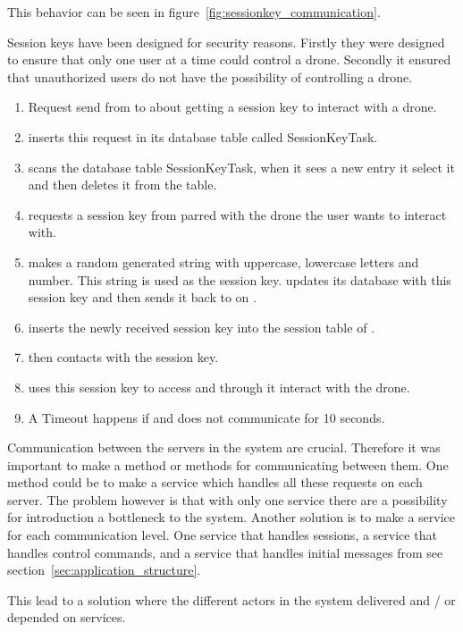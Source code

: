 This behavior can be seen in figure~\ref{fig:sessionkey_communication}. 

Session keys have been designed for security reasons.
Firstly they were designed to ensure that only one user at a time could control a drone.
Secondly it ensured that unauthorized users do not have the possibility of controlling a drone.

\begin{enumerate}
	\item Request send from  to  about getting a session key to interact with a drone.
	\item {} inserts this request in its database table called SessionKeyTask.
	\item {} scans the database table SessionKeyTask, when it sees a new entry it select it and then deletes it from the table.
	\item {} requests a session key from  parred with the drone the user wants to interact with.
	\item {} makes a random generated string with uppercase, lowercase letters and number. This string is used as the session key.  updates its database with this session key and then sends it back to  on .
	\item {} inserts the newly received session key into the session table of .
	\item {} then contacts  with the session key.
	\item {} uses this session key to access  and through it interact with the drone.
	\item A Timeout happens if  and  does not communicate for 10 seconds.
\end{enumerate}

Communication between the servers in the system are crucial. 
Therefore it was important to make a method or methods for communicating between them. 
One method could be to make a service which handles all these requests on each server. 
The problem however is that with only one service there are a possibility for introduction a bottleneck to the system.
Another solution is to make a service for each communication level. One service that handles sessions, a service that handles control commands, and a service that handles initial messages from  see section~\ref{sec:application_structure}.

This lead to a solution where the different actors in the system delivered and / or depended on services.

